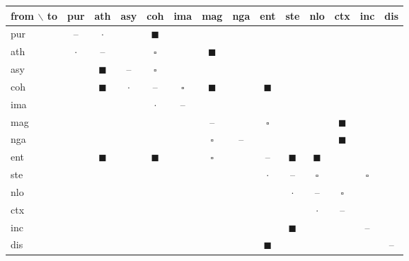 \begin{tabular}{@{}lccccccccccccc@{}}\toprule
from $\backslash$ to & pur & ath & asy & coh & ima & mag & nga & ent & ste & nlo & ctx & inc & dis \\\midrule
pur & -- & $\cdot$ &  & $\blacksquare$ &  &  &  &  &  &  &  &  &  \\
ath & $\cdot$ & -- &  & $\square$ &  & $\blacksquare$ &  &  &  &  &  &  &  \\
asy &  & $\blacksquare$ & -- & $\square$ &  &  &  &  &  &  &  &  &  \\
coh &  & $\blacksquare$ & $\cdot$ & -- & $\square$ & $\blacksquare$ &  & $\blacksquare$ &  &  &  &  &  \\
ima &  &  &  & $\cdot$ & -- &  &  &  &  &  &  &  &  \\
mag &  &  &  &  &  & -- &  & $\square$ &  &  & $\blacksquare$ &  &  \\
nga &  &  &  &  &  & $\square$ & -- &  &  &  & $\blacksquare$ &  &  \\
ent &  & $\blacksquare$ &  & $\blacksquare$ &  & $\square$ &  & -- & $\blacksquare$ & $\blacksquare$ &  &  &  \\
ste &  &  &  &  &  &  &  & $\cdot$ & -- & $\square$ &  & $\square$ &  \\
nlo &  &  &  &  &  &  &  &  & $\cdot$ & -- & $\square$ &  &  \\
ctx &  &  &  &  &  &  &  &  &  & $\cdot$ & -- &  &  \\
inc &  &  &  &  &  &  &  &  & $\blacksquare$ &  &  & -- &  \\
dis &  &  &  &  &  &  &  & $\blacksquare$ &  &  &  &  & -- \\
\bottomrule\end{tabular}
